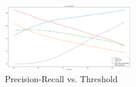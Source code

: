 \begin{figure}[t]
\centering
\includegraphics[width=0.49\textwidth]{figures/research-fields/fast-text-evaluation.png}
\caption{Precision-Recall vs. Threshold}
\label{fig:results_fasttext}
\end{figure}




